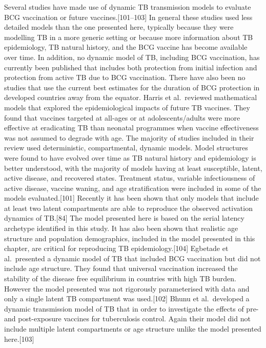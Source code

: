 \documentclass[11pt,twoside]{bristolthesis}
\begin{document}
  Several studies have made use of dynamic TB transmission models to evaluate BCG vaccination or future vaccines.{[}101--103{]} In general these studies used less detailed models than the one presented here, typically because they were modelling TB in a more generic setting or because more information about TB epidemiology, TB natural history, and the BCG vaccine has become available over time. In addition, no dynamic model of TB, including BCG vaccination, has currently been published that includes both protection from initial infection and protection from active TB due to BCG vaccination. There have also been no studies that use the current best estimates for the duration of BCG protection in developed countries away from the equator. Harris et al.~reviewed mathematical models that explored the epidemiological impacts of future TB vaccines. They found that vaccines targeted at all-ages or at adolescents/adults were more effective at eradicating TB than neonatal programmes when vaccine effectiveness was not assumed to degrade with age. The majority of studies included in their review used deterministic, compartmental, dynamic models. Model structures were found to have evolved over time as TB natural history and epidemiology is better understood, with the majority of models having at least susceptible, latent, active disease, and recovered states. Treatment status, variable infectiousness of active disease, vaccine waning, and age stratification were included in some of the models evaluated.{[}101{]} Recently it has been shown that only models that include at least two latent compartments are able to reproduce the observed activation dynamics of TB.{[}84{]} The model presented here is based on the serial latency archetype identified in this study. It has also been shown that realistic age structure and population demographics, included in the model presented in this chapter, are critical for reproducing TB epidemiology.{[}104{]} Egbetade et al.~presented a dynamic model of TB that included BCG vaccination but did not include age structure. They found that universal vaccination increased the stability of the disease free equilibrium in countries with high TB burden. However the model presented was not rigorously parameterised with data and only a single latent TB compartment was used.{[}102{]} Bhunu et al.~developed a dynamic transmission model of TB that in order to investigate the effects of pre- and post-exposure vaccines for tuberculosis control. Again their model did not include multiple latent compartments or age structure unlike the model presented here.{[}103{]}
  
\end{document}
